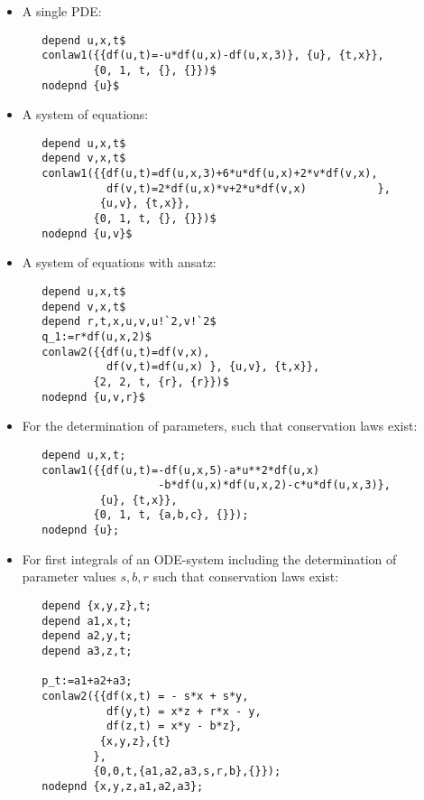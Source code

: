 \begin{itemize}
\item A single PDE:
\begin{verbatim}
   depend u,x,t$
   conlaw1({{df(u,t)=-u*df(u,x)-df(u,x,3)}, {u}, {t,x}},
           {0, 1, t, {}, {}})$
   nodepnd {u}$
\end{verbatim}

\item A system of equations:
\begin{verbatim}
   depend u,x,t$
   depend v,x,t$
   conlaw1({{df(u,t)=df(u,x,3)+6*u*df(u,x)+2*v*df(v,x),
             df(v,t)=2*df(u,x)*v+2*u*df(v,x)           },
            {u,v}, {t,x}},
           {0, 1, t, {}, {}})$
   nodepnd {u,v}$
\end{verbatim}

\item A system of equations with ansatz:
\begin{verbatim}
   depend u,x,t$
   depend v,x,t$
   depend r,t,x,u,v,u!`2,v!`2$
   q_1:=r*df(u,x,2)$
   conlaw2({{df(u,t)=df(v,x),
             df(v,t)=df(u,x) }, {u,v}, {t,x}},
           {2, 2, t, {r}, {r}})$
   nodepnd {u,v,r}$
\end{verbatim}

\item For the determination of parameters, such that conservation laws
  exist:
\begin{verbatim}
   depend u,x,t;
   conlaw1({{df(u,t)=-df(u,x,5)-a*u**2*df(u,x)
                     -b*df(u,x)*df(u,x,2)-c*u*df(u,x,3)},
            {u}, {t,x}},
           {0, 1, t, {a,b,c}, {}});
   nodepnd {u};
\end{verbatim}

\item For first integrals of an ODE-system including the determination
  of parameter values $s,b,r$ such that conservation laws exist:
\begin{verbatim}
   depend {x,y,z},t;
   depend a1,x,t;
   depend a2,y,t;
   depend a3,z,t;

   p_t:=a1+a2+a3;
   conlaw2({{df(x,t) = - s*x + s*y,
             df(y,t) = x*z + r*x - y,
             df(z,t) = x*y - b*z},
            {x,y,z},{t}
           },
           {0,0,t,{a1,a2,a3,s,r,b},{}});
   nodepnd {x,y,z,a1,a2,a3};
\end{verbatim}

\end{itemize}
